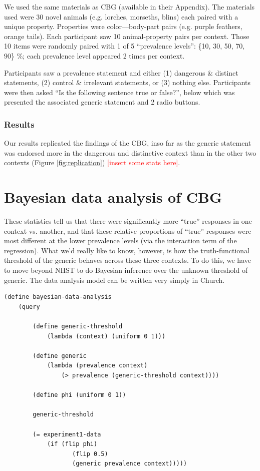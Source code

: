 \documentclass[10pt,letterpaper]{article}
\newcommand{\red}[1]{\textcolor{Red}{#1}}
\begin{document}
We used the same materials as CBG (available in their Appendix). The materials used were 30 novel animals (e.g. lorches, morseths, blins) each paired with a unique property. Properties were color---body-part pairs (e.g. purple feathers, orange tails). Each participant saw 10 animal-property pairs per context. Those 10 items were randomly paired with 1 of 5 ``prevalence levels'': \{10, 30, 50, 70, 90\} \%; each prevalence level appeared 2 times per context. 

Participants saw a prevalence statement and either (1) dangerous \& distinct statements, (2) control \& irrelevant statements, or (3) nothing else. Participants were then asked ``Is the following sentence true or false?'', below which was presented the associated generic statement and 2 radio buttons. 

\subsubsection{Results}

Our results replicated the findings of the CBG, inso far as the generic statement was endorsed more in the dangerous and distinctive context than in the other two contexts (Figure \ref{fig:replication}) \red{[insert some stats here]}. 

\section{Bayesian data analysis of CBG}

These statistics tell us that there were significantly more ``true'' responses in one context vs. another, and that these relative proportions of ``true'' responses were most different at the lower prevalence levels (via the interaction term of the regression). What we'd really like to know, however, is how the truth-functional threshold of the generic behaves across these three contexts. To do this, we have to move beyond NHST to do Bayesian inference over the unknown threshold of generic. The data analysis model can be written very simply in Church.

\begin{lstlisting}
(define bayesian-data-analysis 
	(query
	
		(define generic-threshold 
			(lambda (context) (uniform 0 1)))
	
		(define generic 
			(lambda (prevalence context) 
				(> prevalence (generic-threshold context))))
		
		(define phi (uniform 0 1))
				
		generic-threshold
		
		(= experiment1-data 
			(if (flip phi)
				   (flip 0.5)
				   (generic prevalence context)))))
\end{lstlisting}
\end{document}
